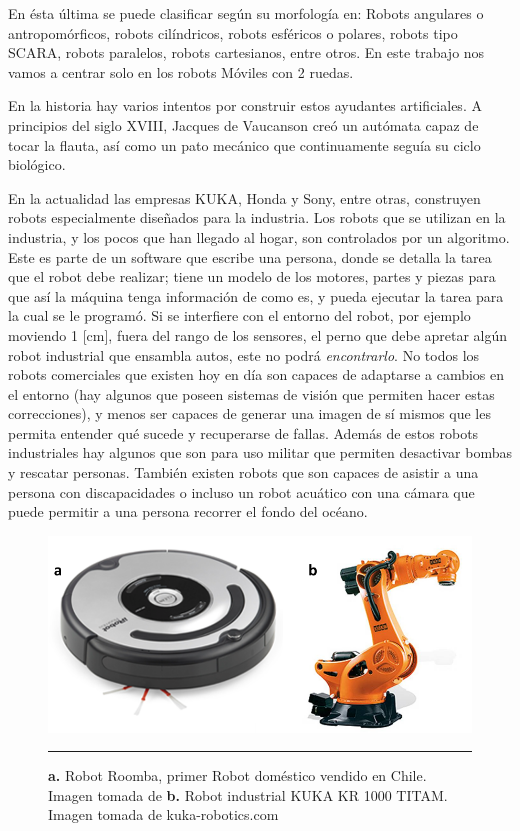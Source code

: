 En ésta última se puede clasificar según su morfología en: Robots angulares o antropomórficos, robots cilíndricos, robots esféricos o polares, robots tipo SCARA, robots paralelos, robots cartesianos, entre otros. En este trabajo nos vamos a centrar solo en los robots Móviles con 2 ruedas.

En la historia hay varios intentos por construir estos ayudantes artificiales. A principios del siglo XVIII, Jacques de Vaucanson creó un autómata capaz de tocar la flauta, así como un pato mecánico que continuamente seguía su ciclo biológico.

En la actualidad las empresas KUKA, Honda y Sony, entre otras, construyen robots especialmente diseñados para la industria. Los robots que se utilizan en la industria, y los pocos que han llegado al hogar, son controlados por un algoritmo. Este es parte de un software que escribe una persona, donde se detalla la tarea que el robot debe realizar; tiene un modelo de los motores, partes y piezas para que así la máquina tenga información de como es, y pueda ejecutar la tarea para la cual se le programó. Si se interfiere con el entorno del robot, por ejemplo moviendo 1 [cm], fuera del rango de los sensores, el perno que debe apretar algún robot industrial que ensambla autos, este no podrá \textit{encontrarlo}. No todos los robots comerciales que existen hoy en día son capaces de adaptarse a cambios en el entorno (hay algunos que poseen sistemas de visión que permiten hacer estas correcciones), y menos ser capaces de generar una imagen de sí mismos que les permita entender qué sucede y recuperarse de fallas. Además de estos robots industriales hay algunos que son para uso militar que permiten desactivar bombas y rescatar personas. También existen robots que son capaces de asistir a una persona con discapacidades o incluso un robot acuático con una cámara que puede permitir a una persona recorrer el fondo del océano. 

\begin{figure}[htbp]
	\centering
		\includegraphics[width=\textwidth]{./Figures/RobotsInd.png}
		\rule{35em}{0.5pt}
	\caption[Robots Roomba y KUKA]{\textbf{a. }Robot Roomba, primer Robot doméstico vendido en Chile. Imagen tomada de \cite{Forlizzi:2006:SRD:1121241.1121286} \textbf{b.} Robot industrial KUKA KR 1000 TITAM. Imagen tomada de kuka-robotics.com}
	\label{fig:Roomba y KUKA}
\end{figure}

